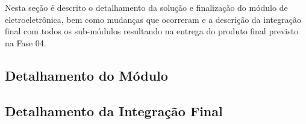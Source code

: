 \label{desenvolvimento_eletroeletronica}

Nesta seção é descrito o detalhamento da solução e finalização do módulo de eletroeletrônica, bem como mudanças que ocorreram e a descrição da integração final com todos os sub-módulos resultando na entrega do produto final previsto na Fase 04.

\subsection{Detalhamento do Módulo}


\subsection{Detalhamento da Integração Final}







